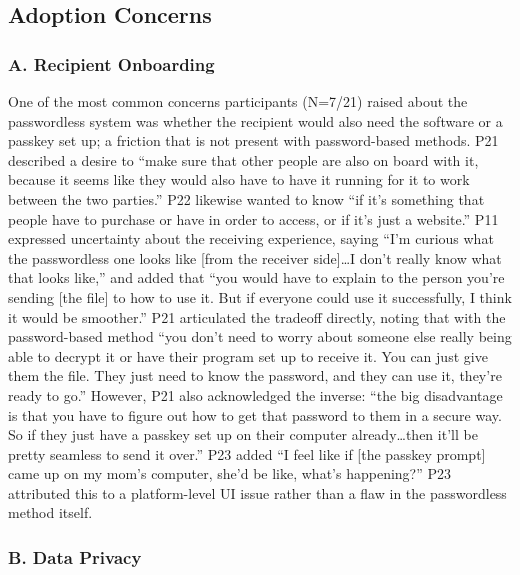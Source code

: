 \subsection{Adoption Concerns}
\label{sec:adoption-concerns}

\subsubsection*{A. Recipient Onboarding}

One of the most common concerns participants (N=7/21) raised about the passwordless system was whether the recipient would also need the software or a passkey set up; a friction that is not present with password-based methods. P21 described a desire to ``make sure that other people are also on board with it, because it seems like they would also have to have it running for it to work between the two parties.'' P22 likewise wanted to know ``if it's something that people have to purchase or have in order to access, or if it's just a website.'' P11 expressed uncertainty about the receiving experience, saying ``I'm curious what the passwordless one looks like [from the receiver side]\ldots I don't really know what that looks like,'' and added that ``you would have to explain to the person you're sending [the file] to how to use it. But if everyone could use it successfully, I think it would be smoother.'' P21 articulated the tradeoff directly, noting that with the password-based method ``you don't need to worry about someone else really being able to decrypt it or have their program set up to receive it. You can just give them the file. They just need to know the password, and they can use it, they're ready to go.'' However, P21 also acknowledged the inverse: ``the big disadvantage is that you have to figure out how to get that password to them in a secure way. So if they just have a passkey set up on their computer already\ldots then it'll be pretty seamless to send it over.'' P23 added ``I feel like if [the passkey prompt] came up on my mom's computer, she'd be like, what's happening?'' P23 attributed this to a platform-level UI issue rather than a flaw in the passwordless method itself.

\subsubsection*{B. Data Privacy}

